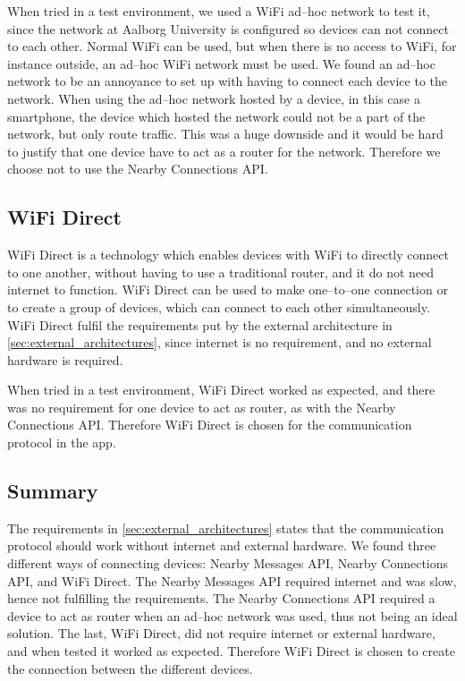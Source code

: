 When tried in a test environment, we used a WiFi ad--hoc network to test it,
since the network at Aalborg University is configured so devices can not connect to each other.
Normal WiFi can be used, but when there is no access to WiFi, for instance outside, an ad--hoc WiFi network must be used. 
We found an ad--hoc network to be an annoyance to set up with having to connect each device to the network.
When using the ad--hoc network hosted by a device, in this case a smartphone,
the device which hosted the network could not be a part of the network, but only route traffic.
This was a huge downside and it would be hard to justify that one device have to act as a router for the network.
Therefore we choose not to use the Nearby Connections API. 

\subsection{WiFi Direct}
WiFi Direct is a technology which enables devices with WiFi to directly connect to one another,
without having to use a traditional router, and it do not need internet to function.
WiFi Direct can be used to make one--to--one connection or to create a group of devices,
which can connect to each other simultaneously.\cite{wifi_direct}
WiFi Direct fulfil the requirements put by the external architecture in \cref{sec:external_architectures},
since internet is no requirement, and no external hardware is required. 

When tried in a test environment, WiFi Direct worked as expected,
and there was no requirement for one device to act as router, as with the Nearby Connections API.
Therefore WiFi Direct is chosen for the communication protocol in the app.

\subsection{Summary}
The requirements in \cref{sec:external_architectures} states that the communication protocol should work without internet and external hardware.
We found three different ways of connecting devices: Nearby Messages API, Nearby Connections API, and WiFi Direct.
The Nearby Messages API required internet and was slow, hence not fulfilling the requirements.
The Nearby Connections API required a device to act as router when an ad--hoc network was used, thus not being an ideal solution.
The last, WiFi Direct, did not require internet or external hardware, and when tested it worked as expected.
Therefore WiFi Direct is chosen to create the connection between the different devices. 
